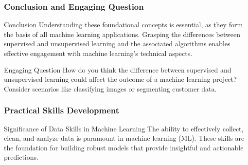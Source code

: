 \documentclass[aspectratio=169]{beamer}
\begin{document}
\begin{frame}[fragile]
    \frametitle{Conclusion and Engaging Question}
    \begin{block}{Conclusion}
        Understanding these foundational concepts is essential, as they form the basis of all machine learning applications. Grasping the differences between supervised and unsupervised learning and the associated algorithms enables effective engagement with machine learning's technical aspects.
    \end{block}
    \begin{block}{Engaging Question}
        How do you think the difference between supervised and unsupervised learning could affect the outcome of a machine learning project? Consider scenarios like classifying images or segmenting customer data.
    \end{block}
\end{frame}

\begin{frame}[fragile]
    \frametitle{Practical Skills Development}
    \begin{block}{Significance of Data Skills in Machine Learning}
        The ability to effectively collect, clean, and analyze data is paramount in machine learning (ML). 
        These skills are the foundation for building robust models that provide insightful and actionable predictions.
    \end{block}
\end{frame}
\end{document}
